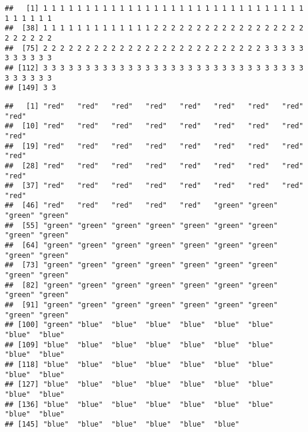 \documentclass{article}
\begin{document}
\begin{verbatim}
##   [1] 1 1 1 1 1 1 1 1 1 1 1 1 1 1 1 1 1 1 1 1 1 1 1 1 1 1 1 1 1 1 1 1 1 1 1 1 1
##  [38] 1 1 1 1 1 1 1 1 1 1 1 1 1 2 2 2 2 2 2 2 2 2 2 2 2 2 2 2 2 2 2 2 2 2 2 2 2
##  [75] 2 2 2 2 2 2 2 2 2 2 2 2 2 2 2 2 2 2 2 2 2 2 2 2 2 2 3 3 3 3 3 3 3 3 3 3 3
## [112] 3 3 3 3 3 3 3 3 3 3 3 3 3 3 3 3 3 3 3 3 3 3 3 3 3 3 3 3 3 3 3 3 3 3 3 3 3
## [149] 3 3
\end{verbatim}

\begin{Shaded}
\begin{Highlighting}[]
\StringTok{ }\NormalTok{(iris[,}\NormalTok{]);}
\end{Highlighting}
\end{Shaded}

\begin{verbatim}
##   [1] "red"   "red"   "red"   "red"   "red"   "red"   "red"   "red"   "red"  
##  [10] "red"   "red"   "red"   "red"   "red"   "red"   "red"   "red"   "red"  
##  [19] "red"   "red"   "red"   "red"   "red"   "red"   "red"   "red"   "red"  
##  [28] "red"   "red"   "red"   "red"   "red"   "red"   "red"   "red"   "red"  
##  [37] "red"   "red"   "red"   "red"   "red"   "red"   "red"   "red"   "red"  
##  [46] "red"   "red"   "red"   "red"   "red"   "green" "green" "green" "green"
##  [55] "green" "green" "green" "green" "green" "green" "green" "green" "green"
##  [64] "green" "green" "green" "green" "green" "green" "green" "green" "green"
##  [73] "green" "green" "green" "green" "green" "green" "green" "green" "green"
##  [82] "green" "green" "green" "green" "green" "green" "green" "green" "green"
##  [91] "green" "green" "green" "green" "green" "green" "green" "green" "green"
## [100] "green" "blue"  "blue"  "blue"  "blue"  "blue"  "blue"  "blue"  "blue" 
## [109] "blue"  "blue"  "blue"  "blue"  "blue"  "blue"  "blue"  "blue"  "blue" 
## [118] "blue"  "blue"  "blue"  "blue"  "blue"  "blue"  "blue"  "blue"  "blue" 
## [127] "blue"  "blue"  "blue"  "blue"  "blue"  "blue"  "blue"  "blue"  "blue" 
## [136] "blue"  "blue"  "blue"  "blue"  "blue"  "blue"  "blue"  "blue"  "blue" 
## [145] "blue"  "blue"  "blue"  "blue"  "blue"  "blue"
\end{verbatim}

\begin{Shaded}
\begin{Highlighting}[]
\NormalTok{(iris[,}\OperatorTok{-}\NormalTok{],}
\end{Highlighting}
\end{Shaded}
\end{document}
